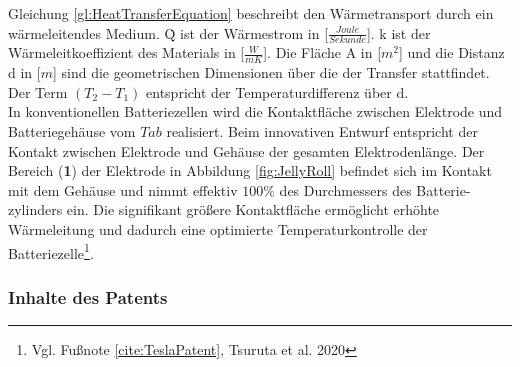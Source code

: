 Gleichung \ref{gl:HeatTransferEquation} beschreibt den Wärmetransport durch ein wärmeleitendes Medium. \.{Q} ist der Wärmestrom in [\textbf{$\frac{Joule}{Sekunde}$}]. k ist der Wärmeleitkoeffizient des Materials in [\textbf{$\frac{W}{mK}$}].
Die Fläche A in [\textbf{$m^{2}$}] und die Distanz d in [\textbf{$m$}] sind die geometrischen Dimensionen über die der Transfer stattfindet. Der Term $(T_{2}-T_{1})$ entspricht der Temperaturdifferenz über d.\\
In konventionellen Batteriezellen wird die Kontaktfläche zwischen Elektrode und Batteriegehäuse vom $Tab$ realisiert. Beim innovativen Entwurf entspricht der Kontakt zwischen Elektrode und Gehäuse der gesamten Elektrodenlänge. Der Bereich (\textbf{1}) der Elektrode in Abbildung \ref{fig:JellyRoll} befindet sich im Kontakt mit dem Gehäuse und nimmt effektiv $100\percent$ des Durchmessers des Batterie-\newline zylinders ein. Die signifikant größere Kontaktfläche ermöglicht erhöhte Wärmeleitung und dadurch eine optimierte Temperaturkontrolle der Batteriezelle\footnote{Vgl. Fußnote \ref{cite:TeslaPatent}, Tsuruta et al. 2020}.\\

\subsubsection*{Inhalte des Patents}

